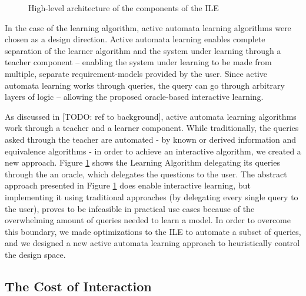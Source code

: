 \begin{figure}[!ht] 
	\centering
	\caption{High-level architecture of the components of the ILE} 
	\label{fig_architcture_informaloverview}
\end{figure}

 In the case of the learning algorithm, active automata learning algorithms were chosen as a design direction. Active automata learning enables complete separation of the learner algorithm and the system under learning through a teacher component -- enabling the system under learning to be made from multiple, separate requirement-models provided by the user. Since active automata learning works through queries, the query can go through arbitrary layers of logic -- allowing the proposed oracle-based interactive learning.
 
 \smallskip

 As discussed in [TODO: ref to background], active automata learning algorithms work through a teacher and a learner component. While traditionally, the queries asked through the teacher are automated - by known or derived information and equivalence algorithms - in order to achieve an interactive algorithm, we created a new approach. Figure \ref{fig_architcture_informaloverview} shows the Learning Algorithm delegating its queries through the an oracle, which delegates the questions to the user. The abstract approach presented in Figure \ref{fig_architcture_informaloverview} does enable interactive learning, but implementing it using traditional approaches (by delegating every single query to the user), proves to be infeasible in practical use cases because of the overwhelming amount of queries needed to learn a model. In order to overcome this boundary, we made optimizations to the ILE to automate a subset of queries, and we designed a new active automata learning approach to heuristically control the design space.

\subsection{The Cost of Interaction} \label{subs_commandhandling}

